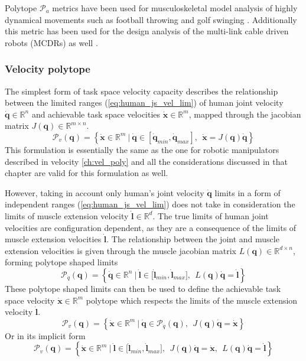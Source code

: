 Polytope $\mathcal{P}_a$ metrics have been used for musculoskeletal model analysis of highly dynamical movements such as football throwing \cite{khatib2009robotics} and golf swinging \cite{demircan2012muscle}. Additionally this metric has been used for the design analysis of the multi-link cable driven robots (MCDRs) as well \cite{sheng2020operational}.

\subsubsection{Velocity polytope}
\label{ch:human_vel_poly}
The simplest form of task space velocity capacity describes the relationship between the limited ranges (\ref{eq:human_js_vel_lim}) of human joint velocity $\dot{\bm{q}} \in \mathbb{R}^n$ and achievable task space velocities $\dot{\bm{x}} \in \mathbb{R}^m$, mapped through the jacobian matrix $J(\bm{q}) \in \mathbb{R}^{m\times n}$.
\begin{equation}
    \mathcal{P}_v(\bm{q}) = \left\{ \dot{\bm{x}} \in \mathbb{R}^m ~|~ \dot{\bm{q}}\in\left[\dot{\bm{q}}_{min}, \dot{\bm{q}}_{max} \right], ~~ \dot{\bm{x}} = J(\bm{q})\dot{\bm{q}} \right\}
\end{equation}
This formulation is essentially the same as the one for robotic manipulators described in velocity \ref{ch:vel_poly} and all the considerations discussed in that chapter are valid for this formulation as well.

However, taking in account only human's joint velocity $\dot{\bm{q}}$ limits in a form of independent ranges (\ref{eq:human_js_vel_lim}) does not take in consideration the limits of muscle extension velocity $\dot{\bm{l}}\in\mathbb{R}^d$. The true limits of human joint velocities are configuration dependent, as they are a consequence of the limits of muscle extension velocities $\dot{\bm{l}}$. The relationship between the joint and muscle extension velocities is given through the muscle jacobian matrix $L(\bm{q}) \in \mathbb{R}^{d\times n}$, forming polytope shaped limits
\begin{equation}
    \mathcal{P}_{\dot{q}}(\bm{q}) = \left\{ \dot{\bm{q}} \in \mathbb{R}^n ~|~ \dot{\bm{l}}\in\big[\dot{\bm{l}}_{min}, \dot{\bm{l}}_{max} \big], ~~ L(\bm{q})\dot{\bm{q}} = \dot{\bm{l}} \right\}
    \label{eq:human_poly_joint_vel}
\end{equation}
These polytope shaped limits can then be used to define the achievable task space velocity $\dot{\bm{x}}\in \mathbb{R}^m$ polytope which respects the limits of the muscle extension velocity $\dot{\bm{l}}$.
\begin{equation}
    \mathcal{P}_v(\bm{q}) = \left\{ \dot{\bm{x}} \in \mathbb{R}^m ~|~ \dot{\bm{q}}\in  \mathcal{P}_{\dot{q}}(\bm{q}), ~~ J(\bm{q})\dot{\bm{q}} = \dot{\bm{x}} \right\}
    \label{eq:velocity_polytope_human_ver_poly_lim}
\end{equation}
Or in its implicit form
\begin{equation}
    \mathcal{P}_v(\bm{q}) = \left\{ \dot{\bm{x}} \in \mathbb{R}^m ~|~ \dot{\bm{l}}\in\big[\dot{\bm{l}}_{min}, \dot{\bm{l}}_{max} \big], ~~ J(\bm{q})\dot{\bm{q}} = \dot{\bm{x}}, ~~ L(\bm{q})\dot{\bm{q}} = \dot{\bm{l}} \right\}
    \label{eq:velocity_polytope_human}
\end{equation}

